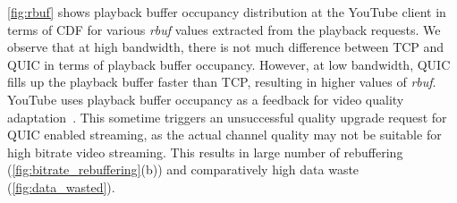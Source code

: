 \fig\ref{fig:rbuf} shows playback buffer occupancy distribution at the YouTube client in terms of \ac{CDF} for various \textit{rbuf} values extracted from the playback requests. We observe that at high bandwidth, there is not much difference between \ac{TCP} and \ac{QUIC} in terms of playback buffer occupancy. However, at low bandwidth, \ac{QUIC} fills up the playback buffer faster than \ac{TCP}, resulting in higher values of \textit{rbuf}. 
YouTube uses playback buffer occupancy as a feedback for video quality adaptation~\cite{mondal2017youtube,krishnappa2013dashing}.
This sometime triggers an unsuccessful quality upgrade request for \ac{QUIC} enabled streaming, as the actual channel quality may not be suitable for high bitrate video streaming. This results in large number of rebuffering (\fig\ref{fig:bitrate_rebuffering}(b)) and comparatively high data waste (\fig\ref{fig:data_wasted}).



